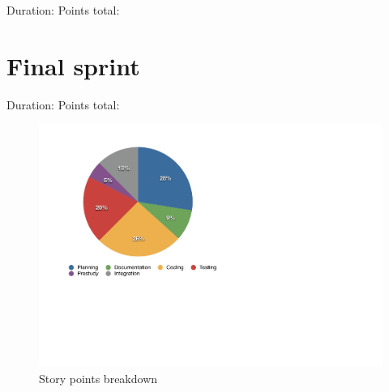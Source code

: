 Duration:
Points total:

\section{Final sprint}

Duration:
Points total:

\begin{figure}[h!]
\centering \includegraphics[scale=0.8]{img/pie_chart.pdf}
\caption{Story points breakdown}
\label{fig:sprints-points}
\end{figure}
